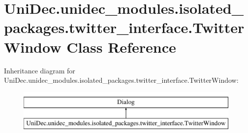 \hypertarget{class_uni_dec_1_1unidec__modules_1_1isolated__packages_1_1twitter__interface_1_1_twitter_window}{}\section{Uni\+Dec.\+unidec\+\_\+modules.\+isolated\+\_\+packages.\+twitter\+\_\+interface.\+Twitter\+Window Class Reference}
\label{class_uni_dec_1_1unidec__modules_1_1isolated__packages_1_1twitter__interface_1_1_twitter_window}
Inheritance diagram for Uni\+Dec.\+unidec\+\_\+modules.\+isolated\+\_\+packages.\+twitter\+\_\+interface.\+Twitter\+Window\+:\begin{figure}[H]
\begin{center}
\leavevmode
\includegraphics[height=2.000000cm]{class_uni_dec_1_1unidec__modules_1_1isolated__packages_1_1twitter__interface_1_1_twitter_window}
\end{center}
\end{figure}
